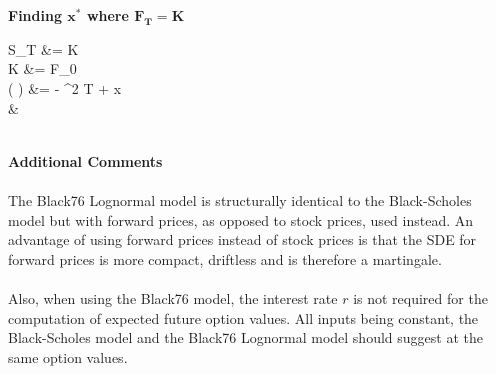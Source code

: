 \documentclass{article}
\begin{document}
\begin{minipage}[t]{0.5\textwidth}
\begin{tcolorbox}[height=12.4cm,boxsep=5pt,arc=0pt,auto outer arc,colback=white,colframe=black]
	\noindent \textbf{Finding $\boldsymbol{x^*}$ where $\boldsymbol{F_T=K}$}
	\begin{flalign*}
	S_T &= K\\
	K &= F_0 \exp{}\\
	\log \left(  \right) &= - \sigma^2 T + \sigma {} x\\
	&
	\end{flalign*}\\
	\noindent \textbf{Additional Comments}\\ \\
	The Black76 Lognormal model is structurally identical to the Black-Scholes model but with forward prices, as opposed to stock prices, used instead. An advantage of using forward prices instead of stock prices is that the SDE for forward prices is more compact, driftless and is therefore a martingale.\\ \\
	Also, when using the Black76 model, the interest rate $r$ is not required for the computation of expected future option values. All inputs being constant, the Black-Scholes model and the Black76 Lognormal model should suggest at the same option values.
\end{tcolorbox}
\end{minipage}\\ 
\end{document}
